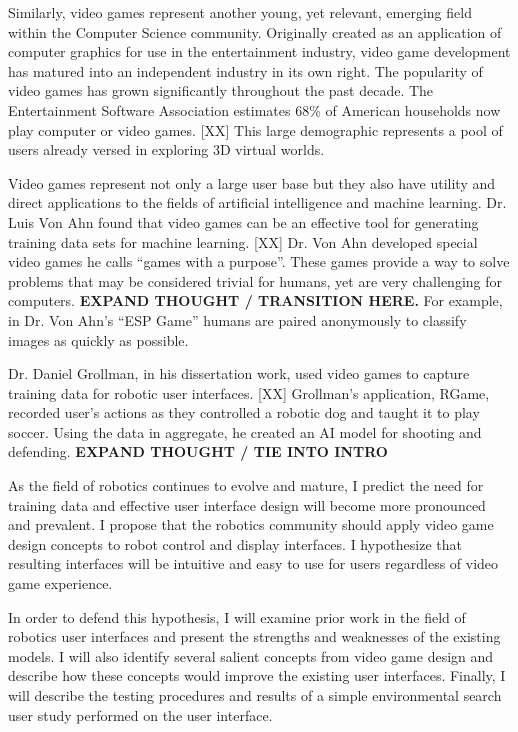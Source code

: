 Similarly, video games represent another young, yet relevant, emerging field within the Computer Science community. Originally created as an application of computer graphics for use in the entertainment industry, video game development has matured into an independent industry in its own right. The popularity of video games has grown significantly throughout the past decade. The Entertainment Software Association estimates 68\% of American households now play computer or video games. [XX] This large demographic represents a pool of users already versed in exploring 3D virtual worlds.

Video games represent not only a large user base but they also have utility and direct applications to the fields of artificial intelligence and machine learning. Dr. Luis Von Ahn found that video games can be an effective tool for generating training data sets for machine learning. [XX] Dr. Von Ahn developed special video games he calls ``games with a purpose''.  These games provide a way to solve problems that may be considered trivial for humans, yet are very challenging for computers. \textbf{EXPAND THOUGHT / TRANSITION HERE.} For example, in Dr. Von Ahn's ``ESP Game'' humans are paired anonymously to classify images as quickly as possible.

Dr. Daniel Grollman, in his dissertation work, used video games to capture training data for robotic user interfaces. [XX] Grollman's application, RGame, recorded user’s actions as they controlled a robotic dog and taught it to play soccer. Using the data in aggregate, he created an AI model for shooting and defending. \textbf{EXPAND THOUGHT / TIE INTO INTRO}

As the field of robotics continues to evolve and mature, I predict the need for training data and effective user interface design will become more pronounced and prevalent. I propose that the robotics community should apply video game design concepts to robot control and display interfaces. I hypothesize that resulting interfaces will be intuitive and easy to use for users regardless of video game experience.

In order to defend this hypothesis, I will examine prior work in the field of robotics user interfaces and present the strengths and weaknesses of the existing models. I will also identify several salient concepts from video game design and describe how these concepts would improve the existing user interfaces. Finally, I will describe the testing procedures and results of a simple environmental search user study performed on the user interface.

